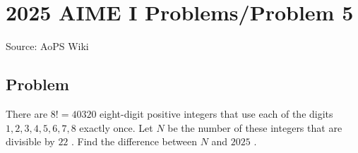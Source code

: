 \documentclass[12pt]{article}
\begin{document}
\section*{{2025 AIME I Problems/Problem 5}}
Source: AoPS Wiki

\subsection*{Problem}
There are $8!= 40320$ eight-digit positive integers that use each of the digits $1, 2, 3, 4, 5, 6, 7, 8$ exactly once. Let $N$ be the number of these integers that are divisible by $22$ . Find the difference between $N$ and $2025$ .
\end{document}
